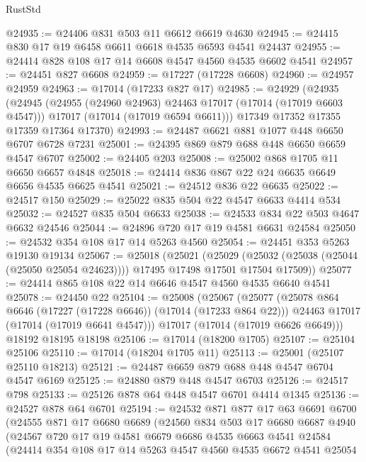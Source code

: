 \begin{lexlean}{RustStd}
\begin{coremodule}
@24935 := @24406 @831 @503 @11 @6612 @6619 @4630
@24945 := @24415 @830 @17 @19 @6458 @6611 @6618 @4535 @6593 @4541 @24437
@24955 := @24414 @828 @108 @17 @14 @6608 @4547 @4560 @4535 @6602 @4541
@24957 := @24451 @827 @6608
@24959 := @17227 (@17228 @6608)
@24960 := @24957 @24959
@24963 := @17014 (@17233 @827 @17)
@24985 := @24929
    (@24935
      (@24945
        (@24955 (@24960 @24963) @24463 @17017 (@17014 (@17019 @6603 @4547)))
        @17017
        (@17014 (@17019 @6594 @6611)))
      @17349
      @17352
      @17355
      @17359
      @17364
      @17370)
@24993 := @24487 @6621 @881 @1077 @448 @6650 @6707 @6728 @7231
@25001 := @24395 @869 @879 @688 @448 @6650 @6659 @4547 @6707
@25002 := @24405 @203
@25008 := @25002 @868 @1705 @11 @6650 @6657 @4848
@25018 := @24414 @836 @867 @22 @24 @6635 @6649 @6656 @4535 @6625 @4541
@25021 := @24512 @836 @22 @6635
@25022 := @24517 @150
@25029 := @25022 @835 @504 @22 @4547 @6633 @4414 @534
@25032 := @24527 @835 @504 @6633
@25038 := @24533 @834 @22 @503 @4647 @6632 @24546
@25044 := @24896 @720 @17 @19 @4581 @6631 @24584
@25050 := @24532 @354 @108 @17 @14 @5263 @4560
@25054 := @24451 @353 @5263 @19130 @19134
@25067 := @25018
    (@25021
      (@25029 (@25032 (@25038 (@25044 (@25050 @25054 @24623)))) @17495 @17498 @17501 @17504 @17509))
@25077 := @24414 @865 @108 @22 @14 @6646 @4547 @4560 @4535 @6640 @4541
@25078 := @24450 @22
@25104 := @25008
    (@25067
      (@25077
        (@25078 @864 @6646 (@17227 (@17228 @6646)) (@17014 (@17233 @864 @22)))
        @24463
        @17017
        (@17014 (@17019 @6641 @4547)))
      @17017
      (@17014 (@17019 @6626 @6649)))
    @18192
    @18195
    @18198
@25106 := @17014 (@18200 @1705)
@25107 := @25104 @25106
@25110 := @17014 (@18204 @1705 @11)
@25113 := @25001 (@25107 @25110 @18213)
@25121 := @24487 @6659 @879 @688 @448 @4547 @6704 @4547 @6169
@25125 := @24880 @879 @448 @4547 @6703
@25126 := @24517 @798
@25133 := @25126 @878 @64 @448 @4547 @6701 @4414 @1345
@25136 := @24527 @878 @64 @6701
@25194 := @24532
    @871
    @877
    @17
    @63
    @6691
    @6700
    (@24555
      @871
      @17
      @6680
      @6689
      (@24560
        @834
        @503
        @17
        @6680
        @6687
        @4940
        (@24567
          @720
          @17
          @19
          @4581
          @6679
          @6686
          @4535
          @6663
          @4541
          @24584
          (@24414
            @354
            @108
            @17
            @14
            @5263
            @4547
            @4560
            @4535
            @6672
            @4541
            @25054

\end{coremodule}
\end{lexlean}
